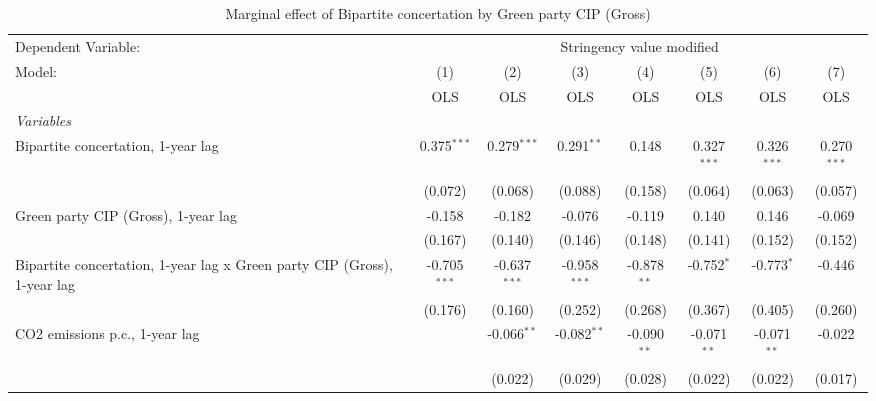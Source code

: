 
\begin{table}[htbp]
   \caption{Marginal effect of Bipartite concertation by Green party CIP (Gross)}
   \centering
   \begin{tabular}{lccccccc}
      \toprule
      Dependent Variable: & \multicolumn{7}{c}{Stringency value modified}\\
      Model:                                                                   & (1)            & (2)            & (3)            & (4)           & (5)           & (6)           & (7)\\  
                                                                               &  OLS           & OLS            & OLS            & OLS           & OLS           & OLS           & OLS\\  
      \midrule
      \emph{Variables}\\
      Bipartite concertation, 1-year lag                                       & 0.375$^{***}$  & 0.279$^{***}$  & 0.291$^{**}$   & 0.148         & 0.327$^{***}$ & 0.326$^{***}$ & 0.270$^{***}$\\   
                                                                               & (0.072)        & (0.068)        & (0.088)        & (0.158)       & (0.064)       & (0.063)       & (0.057)\\   
      Green party CIP (Gross), 1-year lag                                      & -0.158         & -0.182         & -0.076         & -0.119        & 0.140         & 0.146         & -0.069\\   
                                                                               & (0.167)        & (0.140)        & (0.146)        & (0.148)       & (0.141)       & (0.152)       & (0.152)\\   
      Bipartite concertation, 1-year lag x Green party CIP (Gross), 1-year lag & -0.705$^{***}$ & -0.637$^{***}$ & -0.958$^{***}$ & -0.878$^{**}$ & -0.752$^{*}$  & -0.773$^{*}$  & -0.446\\   
                                                                               & (0.176)        & (0.160)        & (0.252)        & (0.268)       & (0.367)       & (0.405)       & (0.260)\\   
      CO2 emissions p.c., 1-year lag                                           &                & -0.066$^{**}$  & -0.082$^{**}$  & -0.090$^{**}$ & -0.071$^{**}$ & -0.071$^{**}$ & -0.022\\   
                                                                               &                & (0.022)        & (0.029)        & (0.028)       & (0.022)       & (0.022)       & (0.017)\\   

\end{tabular}
\end{table}
